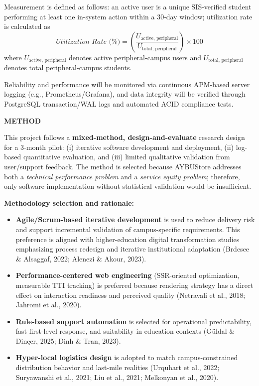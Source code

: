 \documentclass[10pt,a4paper]{article}
\newcommand{\subhead}[1]{\vspace{0.8em}\noindent\textbf{\fontsize{10}{11}\selectfont #1}\par\vspace{0.3em}}
\begin{document}
Measurement is defined as follows: an active user is a unique SIS-verified student performing at least one in-system action within a 30-day window; utilization rate is calculated as
\[
\textit{Utilization Rate (\%)} = \left(\frac{U_{\mathrm{active,\,peripheral}}}{U_{\mathrm{total,\,peripheral}}}\right) \times 100
\]
where $U_{\mathrm{active,\,peripheral}}$ denotes active peripheral-campus users and $U_{\mathrm{total,\,peripheral}}$ denotes total peripheral-campus students.

Reliability and performance will be monitored via continuous APM-based server logging (e.g., Prometheus/Grafana), and data integrity will be verified through PostgreSQL transaction/WAL logs and automated ACID compliance tests.

\subhead{METHOD}
This project follows a \textbf{mixed-method, design-and-evaluate} research design for a 3-month pilot: (i) iterative software development and deployment, (ii) log-based quantitative evaluation, and (iii) limited qualitative validation from user/support feedback. The method is selected because AYBUStore addresses both a \textit{technical performance problem} and a \textit{service equity problem}; therefore, only software implementation without statistical validation would be insufficient.

\textbf{Methodology selection and rationale:}
\begin{itemize}
    \item \textbf{Agile/Scrum-based iterative development} is used to reduce delivery risk and support incremental validation of campus-specific requirements. This preference is aligned with higher-education digital transformation studies emphasizing process redesign and iterative institutional adaptation (Brdesee \& Alsaggaf, 2022; Alenezi \& Akour, 2023).
    \item \textbf{Performance-centered web engineering} (SSR-oriented optimization, measurable TTI tracking) is preferred because rendering strategy has a direct effect on interaction readiness and perceived quality (Netravali et al., 2018; Jahromi et al., 2020).
    \item \textbf{Rule-based support automation} is selected for operational predictability, fast first-level response, and suitability in education contexts (Güldal \& Dinçer, 2025; Dinh \& Tran, 2023).
    \item \textbf{Hyper-local logistics design} is adopted to match campus-constrained distribution behavior and last-mile realities (Urquhart et al., 2022; Suryawanshi et al., 2021; Liu et al., 2021; Melkonyan et al., 2020).
\end{itemize}
\end{document}
